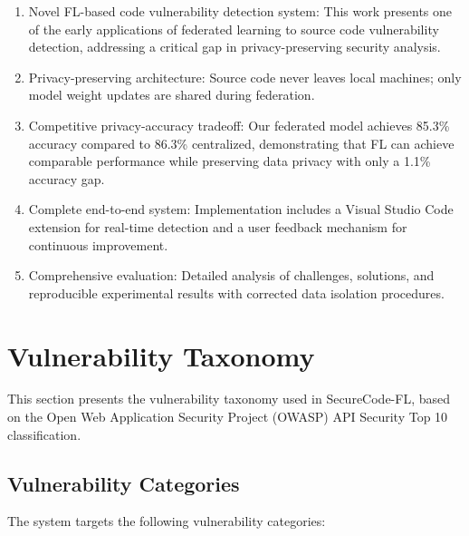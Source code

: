 \documentclass[conference]{IEEEtran}
\begin{document}
\begin{enumerate}
    \item Novel FL-based code vulnerability detection system: This work presents one of the early applications of federated learning to source code vulnerability detection, addressing a critical gap in privacy-preserving security analysis.
    
    \item Privacy-preserving architecture: Source code never leaves local machines; only model weight updates are shared during federation.
    
    \item Competitive privacy-accuracy tradeoff: Our federated model achieves 85.3\% accuracy compared to 86.3\% centralized, demonstrating that FL can achieve comparable performance while preserving data privacy with only a 1.1\% accuracy gap.
    
    \item Complete end-to-end system: Implementation includes a Visual Studio Code extension for real-time detection and a user feedback mechanism for continuous improvement.
    
    \item Comprehensive evaluation: Detailed analysis of challenges, solutions, and reproducible experimental results with corrected data isolation procedures.
\end{enumerate}

\section{Vulnerability Taxonomy}

This section presents the vulnerability taxonomy used in SecureCode-FL, based on the Open Web Application Security Project (OWASP) API Security Top 10 classification.

\subsection{Vulnerability Categories}

The system targets the following vulnerability categories:
\end{document}
